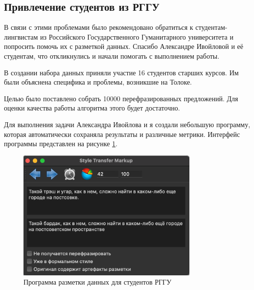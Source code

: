 
\subsection{Привлечение студентов из РГГУ}

В связи с этими проблемами было рекомендовано обратиться к студентам-лингвистам из Российского Государственного Гуманитарного университета и попросить помочь их с разметкой данных. Спасибо Александре Ивойловой и её студентам, что откликнулись и начали помогать с выполнением работы.

В создании набора данных приняли участие 16 студентов старших курсов.
Им были объяснена специфика и проблемы, возникшие на Толоке.

Целью было поставлено собрать 10000 перефразированных предложений. Для оценки качества работы алгоритма этого будет достаточно.

Для выполнения задачи Александра Ивойлова и я создали небольшую программу, которая автоматически сохраняла результаты и различные метрики. Интерфейс программы представлен на рисунке \ref{fig:data_tool_rggu}.

\begin{figure}[ht]
  \centering
  \includegraphics[width=0.8\textwidth]{figures/data_tool_rggu.png}
  \caption{Программа разметки данных для студентов РГГУ}
  \label{fig:data_tool_rggu}
\end{figure}

